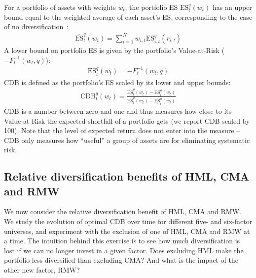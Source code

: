 For a portfolio of assets with weights $w_t$, the portfolio ES $\text{ES}_t^q(w_t)$ has an upper bound equal to the weighted average of each asset's ES, corresponding to the case of no diversification~\autocite{Artzner1999}:
\begin{align}
  \overline{\text{ES}}_t^q(w_t) = \sum_{i=1}^N w_{i,t} \text{ES}_{i,t}^q(r_{i,t})
\end{align}
A lower bound on portfolio ES is given by the portfolio's Value-at-Risk ($-F_{t}^{-1}(w_t, q)$):
\begin{align}
  \underline{\text{ES}}_t^q(w_t) = -F_{t}^{-1}(w_t, q)
\end{align}
CDB is defined as the portfolio's ES scaled by its lower and upper bounds:
\begin{align}
  \text{CDB}_t^q(w_t) = \frac{\overline{\text{ES}}_t^q(w_t) - \text{ES}_t^q(w_t)}{\overline{\text{ES}}_t^q(w_t) - \underline{\text{ES}}_t^q(w_t)}
\end{align}
CDB is a number between zero and one and thus measures how close to its Value-at-Risk the expected shortfall of a portfolio gets (we report CDB scaled by 100). Note that the level of expected return does not enter into the measure -- CDB only measures how ``useful'' a group of assets are for eliminating systematic risk.

\subsection{Relative diversification benefits of HML, CMA and RMW}

We now consider the relative diversification benefit of HML, CMA and RMW. We study the evolution of optimal CDB over time for different five- and six-factor universes, and experiment with the exclusion of one of HML, CMA and RMW at a time. The intuition behind this exercise is to see how much diversification is lost if we can no longer invest in a given factor. Does excluding HML make the portfolio less diversified than excluding CMA? And what is the impact of the other new factor, RMW?

